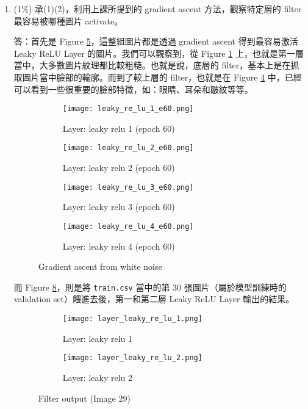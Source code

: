 \documentclass[12pt,a4paper]{extarticle}
\begin{document}
\begin{enumerate}
  \newpage

	\item (1\%) 承(1)(2)，利用上課所提到的 gradient ascent 方法，觀察特定層的 filter 最容易被哪種圖片 activate。
	\par 答：首先是 Figure \ref{fig:ga-white-noise}，這整組圖片都是透過 gradient ascent 得到最容易激活 Leaky ReLU Layer 的圖片。我們可以觀察到，從 Figure \ref{fig:leaky_relu_1_e60} 上，也就是第一層當中，大多數圖片紋理都比較粗糙。也就是說，底層的 filter，基本上是在抓取圖片當中臉部的輪廓。而到了較上層的 filter，也就是在 Figure \ref{fig:leaky_relu_4_e60} 中，已經可以看到一些很重要的臉部特徵，如：眼睛、耳朵和皺紋等等。

  \begin{figure}[H]
    \begin{subfigure}[t]{0.5\textwidth}
      \centering
      \texttt{[image: leaky\_re\_lu\_1\_e60.png]}
      \caption{Layer: leaky relu 1 (epoch 60)}
      \label{fig:leaky_relu_1_e60}
    \end{subfigure}
    \begin{subfigure}[t]{0.5\textwidth}
      \centering
      \texttt{[image: leaky\_re\_lu\_2\_e60.png]}
      \caption{Layer: leaky relu 2 (epoch 60)}
      \label{fig:leaky_relu_2_e60}
    \end{subfigure}
    \begin{subfigure}[t]{0.5\textwidth}
      \centering
      \texttt{[image: leaky\_re\_lu\_3\_e60.png]}
      \caption{Layer: leaky relu 3 (epoch 60)}
      \label{fig:leaky_relu_3_e60}
    \end{subfigure}
    \begin{subfigure}[t]{0.5\textwidth}
      \centering
      \texttt{[image: leaky\_re\_lu\_4\_e60.png]}
      \caption{Layer: leaky relu 4 (epoch 60)}
      \label{fig:leaky_relu_4_e60}
    \end{subfigure}
    \caption{Gradient ascent from white noise}
    \label{fig:ga-white-noise}
  \end{figure}

  \par 而 Figure \ref{fig:filter-output}，則是將 \texttt{train.csv} 當中的第 30 張圖片（屬於模型訓練時的 validation set）餵進去後，第一和第二層 Leaky ReLU Layer 輸出的結果。

  \begin{figure}[H]
    \begin{subfigure}[t]{0.5\textwidth}
      \centering
      \texttt{[image: layer\_leaky\_re\_lu\_1.png]}
      \caption{Layer: leaky relu 1}
      \label{fig:leaky_relu_1_output}
    \end{subfigure}
    \begin{subfigure}[t]{0.5\textwidth}
      \centering
      \texttt{[image: layer\_leaky\_re\_lu\_2.png]}
      \caption{Layer: leaky relu 2}
      \label{fig:leaky_relu_2_output}
    \end{subfigure}
    \caption{Filter output (Image 29)}
    \label{fig:filter-output}
  \end{figure}


\end{enumerate}
\end{document}
